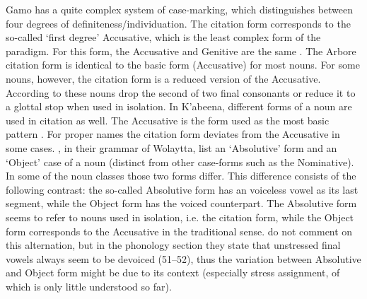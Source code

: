 
Gamo has a quite complex system of case-marking, which distinguishes between four degrees of definiteness/individuation. 
The citation form corresponds to the so-called `first degree' Accusative, which is the least complex form of the paradigm. 
For this form, the Accusative and Genitive are the same \citep[370]{Hompo:1990}.
The Arbore citation form is identical to the basic form ({Accusative}) for most nouns. 
For some nouns, however, the citation form is a reduced version of the Accusative. 
According to \citet[133]{Hayward:1984} these nouns drop the second of two final consonants or reduce it to a glottal stop when used in isolation.
In K'abeena, different forms of a noun are used in citation as well. 
The {Accusative} is the form used as the most basic pattern \citep[61]{Crass:2005}. 
For proper names the citation form deviates from the {Accusative} in some cases. %
\citet[67--68]{Lamberti:1997}, in their grammar of  Wolaytta, list an `Absolutive' form and an `Object' case of a noun (distinct from other case-forms such as the Nominative). 
In some of the noun classes those two forms differ. 
This difference consists of the following contrast: the so-called Absolutive form has an voiceless vowel as its last segment, while the Object form has the voiced counterpart. 
The Absolutive form seems to refer to nouns used in isolation, i.e. the citation form, while the Object form corresponds to the Accusative in the traditional sense. 
\citeauthor{Lamberti:1997} do not comment on this alternation, but in the phonology section they state that unstressed final vowels always seem to be devoiced (51--52), thus the variation between Absolutive and Object form might be due to its context (especially stress assignment, of which is only little understood so far). 




